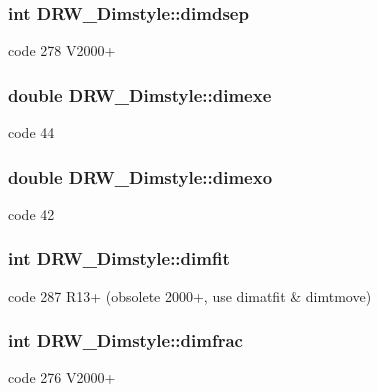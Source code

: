 \subsubsection[{dimdsep}]{\setlength{\rightskip}{0pt plus 5cm}int D\+R\+W\+\_\+\+Dimstyle\+::dimdsep}\label{class_d_r_w___dimstyle_a55bca8cbe1928c4f9cbde1c07041c121}
code 278 V2000+ \hypertarget{class_d_r_w___dimstyle_af1d89fe302b0147db6db850a6382b743}{}
\subsubsection[{dimexe}]{\setlength{\rightskip}{0pt plus 5cm}double D\+R\+W\+\_\+\+Dimstyle\+::dimexe}\label{class_d_r_w___dimstyle_af1d89fe302b0147db6db850a6382b743}
code 44 \hypertarget{class_d_r_w___dimstyle_a22b63c5e53a889bfd549cc476e5bdd4a}{}
\subsubsection[{dimexo}]{\setlength{\rightskip}{0pt plus 5cm}double D\+R\+W\+\_\+\+Dimstyle\+::dimexo}\label{class_d_r_w___dimstyle_a22b63c5e53a889bfd549cc476e5bdd4a}
code 42 \hypertarget{class_d_r_w___dimstyle_a6ea2dea32359478e0b37777f679d212c}{}
\subsubsection[{dimfit}]{\setlength{\rightskip}{0pt plus 5cm}int D\+R\+W\+\_\+\+Dimstyle\+::dimfit}\label{class_d_r_w___dimstyle_a6ea2dea32359478e0b37777f679d212c}
code 287 R13+ (obsolete 2000+, use dimatfit \& dimtmove) \hypertarget{class_d_r_w___dimstyle_aa1c69e4b8d22cc906db95161d110d115}{}
\subsubsection[{dimfrac}]{\setlength{\rightskip}{0pt plus 5cm}int D\+R\+W\+\_\+\+Dimstyle\+::dimfrac}\label{class_d_r_w___dimstyle_aa1c69e4b8d22cc906db95161d110d115}
code 276 V2000+ \hypertarget{class_d_r_w___dimstyle_af258a983498f66472b6c5b51d368980b}{}
